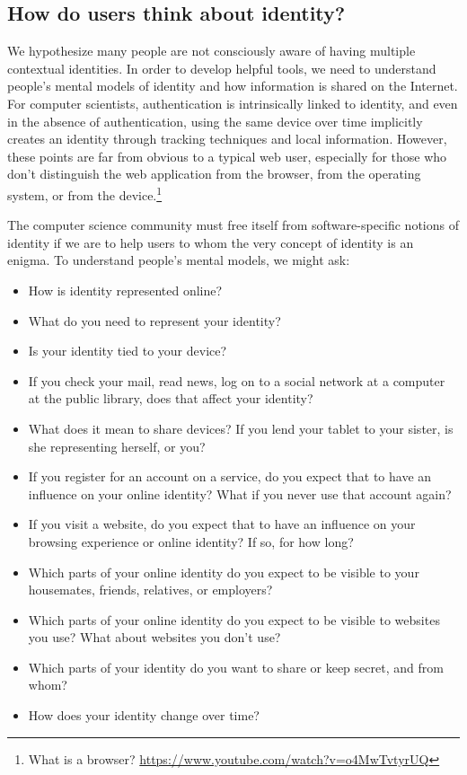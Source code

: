 \documentclass[10pt, conference, compsocconf]{IEEEtran}
\begin{document}
\subsection{How do users think about identity?}
We hypothesize many people are not consciously aware of having multiple
contextual identities. In order to develop helpful tools, we need to
understand people's mental models of identity and how information is shared on
the Internet. For computer scientists, authentication is intrinsically linked
to identity, and even in the absence of authentication, using the same device
over time implicitly creates an identity through tracking techniques and local
information. However, these points are far from obvious to a typical web user,
especially for those who don't distinguish the web application from the
browser, from the operating system, or from the device.\footnote{What is a
browser? \url{https://www.youtube.com/watch?v=o4MwTvtyrUQ}}

The computer science community must free itself from software-specific
notions of identity if we are to help users to whom the very concept of
identity is an enigma. To understand people's mental models,
we might ask:

\begin{itemize}
\item How is identity represented online?
\item What do you need to represent your identity?
\item Is your identity tied to your device?
\item If you check your mail, read news, log on to a social network at a
computer at the public library, does that affect your identity?
\item What does it mean to share devices? If you lend your tablet to your
sister, is she representing herself, or you?
\item If you register for an account on a service, do you expect that to have
an influence on your online identity? What if you never use that account again?
\item If you visit a website, do you expect that to have an influence on your
browsing experience or online identity? If so, for how long?
\item Which parts of your online identity do you expect to be visible to
your housemates, friends, relatives, or employers?
\item Which parts of your online identity do you expect to be visible to
websites you use? What about websites you don't use?
\item Which parts of your identity do you want to share or keep secret, and from whom?
\item How does your identity change over time?
\end{itemize}
\end{document}

